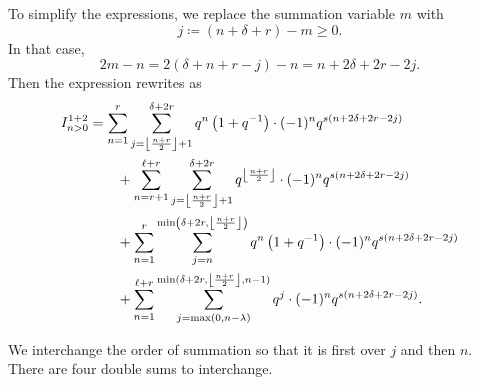 To simplify the expressions, we replace the summation variable $m$ with
\[ j \coloneqq (n + \delta + r) - m \geq 0. \]
In that case,
\[ 2m-n = 2(\delta+n+r-j)-n = n + 2\delta + 2r - 2j. \]
Then the expression rewrites as
\begin{align*}
  I_{n > 0}^{\text{1+2}}
  &= \sum_{n=1}^{r}
    \sum_{j = \left\lfloor \frac{n+r}{2} \right\rfloor+ 1}^{\delta + 2r}
    q^{n} \left( 1 + q^{-1} \right) \cdot (-1)^n q^{s(n+2\delta+2r-2j)} \\
  &\qquad+ \sum_{n=r+1}^{\ell+r}
    \sum_{j = \left\lfloor \frac{n+r}{2} \right\rfloor+ 1}^{\delta + 2r}
    q^{\left\lfloor \frac{n+r}{2} \right\rfloor} \cdot (-1)^n q^{s(n+2\delta+2r-2j)} \\
  &\qquad+ \sum_{n=1}^{r}
    \sum_{j=n}^{\min\left( \delta+2r, \left\lfloor \frac{n+r}{2} \right\rfloor \right)}
    q^{n} \left( 1 + q^{-1} \right) \cdot (-1)^n q^{s(n+2\delta+2r-2j)} \\
  &\qquad+ \sum_{n=1}^{\ell+r}
    \sum_{j=\max(0,n-\lambda)}^{\min(\delta+2r, \left\lfloor \frac{n+r}{2} \right\rfloor, n-1)}
    q^{j} \cdot (-1)^n q^{s(n+2\delta+2r-2j)}.
\end{align*}

We interchange the order of summation so that it is first over $j$ and then $n$.
There are four double sums to interchange.

